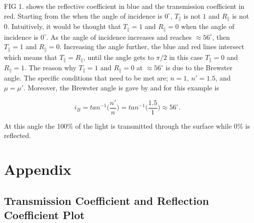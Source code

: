 \documentclass[11pt]{article}
\begin{document}
FIG 1. shows the reflective coefficient in blue and the transmission coefficient in red. Starting from the when the angle of incidence is $0^{\circ}$, $T_{\parallel}$ is not $1$ and $R_{\parallel}$ is not $0$. Intuitively, it would be thought that $T_{\parallel} = 1$ and $R_{\parallel} = 0$ when the angle of incidence is $0^{\circ}$. As the angle of incidence increases and reaches $\approx 56^{\circ}$, then $T_{\parallel} = 1$ and $R_{\parallel} = 0$. Increasing the angle further, the blue and red lines intersect which means that $T_{\parallel} = R_{\parallel}$, until the angle gets to $\pi/2$ in this case $T_{\parallel} = 0$ and $R_{\parallel} = 1$. The reason why $T_{\parallel} = 1$ and $R_{\parallel} = 0$ at $\approx 56^{\circ}$ is due to the Brewster angle. The specific conditions that need to be met are; $n = 1$, $n' = 1.5$, and $\mu = \mu'$. Moreover, the Brewster angle is gave by and for this example is 

$$
i_{B} = tan^{-1}\Bigg(\frac{n'}{n}\Bigg) = tan^{-1}\Bigg(\frac{1.5}{1}\Bigg) \approx 56^{\circ}.
$$

At this angle the 100\% of the light is transmitted through the surface while 0\% is reflected.

\clearpage

\section*{Appendix}

\subsection*{Transmission Coefficient and Reflection Coefficient Plot}


\clearpage
\end{document}
